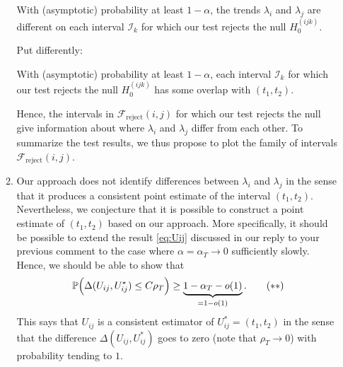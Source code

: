 \documentclass[a4paper,12pt]{article}
\begin{document}
\begin{enumerate}[label=(\arabic*),leftmargin=0.7cm]
\begin{enumerate}[label=(\roman*),leftmargin=0.75cm]
\begin{center}
\begin{minipage}{0.8\textwidth}
With (asymptotic) probability at least $1-\alpha$, the trends $\lambda_i$ and $\lambda_j$ are different on each interval $\mathcal{I}_k$ for which our test rejects the null $H_0^{(ijk)}$.
\end{minipage}
\end{center} 
\vspace{0.1cm}

Put differently:
\vspace{0.1cm}

\begin{center}
\begin{minipage}{0.8\textwidth}
With (asymptotic) probability at least $1-\alpha$, each interval $\mathcal{I}_k$ for which our test rejects the null $H_0^{(ijk)}$ has some overlap with $(t_1,t_2)$.
\end{minipage}
\end{center}
\vspace{0.1cm}

Hence, the intervals in $\mathcal{F}_{\text{reject}}(i,j)$ for which our test rejects the null give information about where $\lambda_i$ and $\lambda_j$ differ from each other. To summarize the test results, we thus propose to plot the family of intervals $\mathcal{F}_{\text{reject}}(i,j)$. 

\item Our approach does not identify differences between $\lambda_i$ and $\lambda_j$ in the sense that it produces a consistent point estimate of the interval $(t_1,t_2)$. Nevertheless, we conjecture that it is possible to construct a point estimate of $(t_1,t_2)$ based on our approach. More specifically, it should be possible to extend the result \eqref{eq:Uij} discussed in our reply to your previous comment to the case where $\alpha = \alpha_T \to 0$ sufficiently slowly. Hence, we should be able to show that 
\begin{equation}\label{eq:Uij-conjecture}
\mathbb{P} \Big( \Delta(U_{ij}, U_{ij}^*) \le C \rho_T \Big) \ge \underbrace{1-\alpha_T - o(1)}_{= 1 - o(1)}. \tag{$**$}
\end{equation}
This says that $U_{ij}$ is a consistent estimator of $U_{ij}^* = (t_1,t_2)$ in the sense that the difference $\Delta(U_{ij}, U_{ij}^*)$ goes to zero (note that $\rho_T \to 0$) with probability tending to $1$. 

\end{enumerate}


\end{enumerate}
\end{document}
